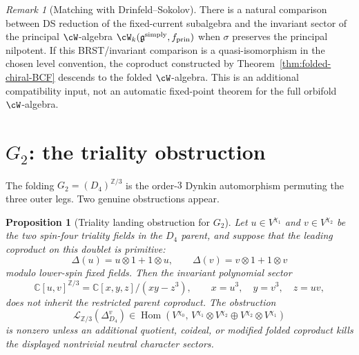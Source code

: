\documentclass[11pt]{amsart}
\newtheorem{proposition}[theorem]{Proposition}
\theoremstyle{definition}
\theoremstyle{remark}
\newtheorem{remark}[theorem]{Remark}
\providecommand{\fg}{\mathfrak{g}}
\begin{document}
\begin{remark}[Matching with Drinfeld--Sokolov]
There is a natural comparison between DS reduction of the fixed-current
subalgebra and the invariant sector of the principal $\cW$-algebra
$\cW_k(\fg^{\mathrm{simply}}, f_{\mathrm{prin}})$ when $\sigma$
preserves the principal nilpotent. If this BRST/invariant comparison is
a quasi-isomorphism in the chosen level convention, the coproduct
constructed by Theorem~\ref{thm:folded-chiral-BCF} descends to the folded
$\cW$-algebra. This is an additional compatibility input, not an
automatic fixed-point theorem for the full orbifold $\cW$-algebra.
\end{remark}

\section{$G_2$: the triality obstruction}
\label{sec:G2-triality}

The folding $G_2 = (D_4)^{\mathbb{Z}/3}$ is the order-$3$ Dynkin
automorphism permuting the three outer legs. Two genuine obstructions
appear.

\begin{proposition}[Triality landing obstruction for $G_2$]%
\label{prop:G2-folding-obstruction}%
Let $u\in V^{\chi_1}$ and $v\in V^{\chi_2}$ be the two spin-four
triality fields in the $D_4$ parent, and suppose that the leading
coproduct on this doublet is primitive:
\[
  \Delta(u)=u\otimes 1+1\otimes u,\qquad
  \Delta(v)=v\otimes 1+1\otimes v
\]
modulo lower-spin fixed fields. Then the invariant polynomial sector
\[
  \mathbb C[u,v]^{\mathbb Z/3}
  =
  \mathbb C[x,y,z]/(xy-z^3),
  \qquad
  x=u^3,\quad y=v^3,\quad z=uv,
\]
does not inherit the restricted parent coproduct. The obstruction
\[
  \mathcal L_{\mathbb Z/3}(\Delta^v_{D_4})
  \in
  \operatorname{Hom}\!\left(
    V^{\chi_0},\,
    V^{\chi_1}\otimes V^{\chi_2}
    \oplus
    V^{\chi_2}\otimes V^{\chi_1}
  \right)
\]
is nonzero unless an additional quotient, coideal, or modified folded
coproduct kills the displayed nontrivial neutral character sectors.
\end{proposition}
\end{document}
